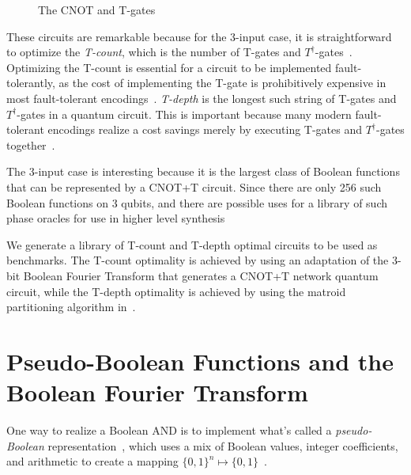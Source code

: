 \documentclass[a4paper]{article}
\makeatletter
\newcommand{\sublabel}[1]{\protected@edef\@currentlabel{\thefigure(\thesubfigure)}\label{#1}}
\makeatother
\begin{document}
\begin{figure}[t]
  \begin{minipage}{0.45\textwidth}
    \centering
    \scalebox{1.0}{
      
    }
    \sublabel{fig-cnot}
  \end{minipage}
  \begin{minipage}{0.45\textwidth}
  \centering
    \scalebox{1.0} {
      
    }
    \sublabel{fig-tgate}
    \scalebox{1.0} {
      
    }
    \sublabel{fig-tdgate}
  \end{minipage}
  \caption{The CNOT and T-gates}
  \label{fig-gates}
\end{figure}

These circuits are remarkable because for the 3-input case, it is straightforward to optimize
the {\it T-count}, which is the number of T-gates and $T^{\dagger}$-gates~\cite{amy-meet-in-middle}.
Optimizing the T-count is essential for a circuit to be implemented fault-tolerantly, as
the cost of implementing the T-gate is prohibitively expensive in most fault-tolerant
encodings~\cite{bib-herr-lattice,bib-fowler-bridge}. {\it T-depth} is the longest such
string of T-gates and $T^{\dagger}$-gates in a quantum circuit. This is important because many modern
fault-tolerant encodings realize a cost savings merely by executing T-gates and $T^{\dagger}$-gates
together~\cite{bib-google-ecc}.

The 3-input case is interesting because it is the largest class of Boolean functions that can be
represented by a CNOT+T circuit. Since there are only 256 such Boolean functions on 3 qubits, and
there are possible uses for a library of such phase oracles for use in higher level synthesis

We generate a library of T-count and T-depth optimal circuits to be used as benchmarks. The T-count
optimality is achieved by using an adaptation of the 3-bit Boolean Fourier Transform that generates
a CNOT+T network quantum circuit, while the T-depth optimality is achieved by using the matroid partitioning
algorithm in~\cite{bib-amy-matroid}.

\section{Pseudo-Boolean Functions and the Boolean Fourier Transform}

One way to realize a Boolean AND is to implement what's called a {\it pseudo-Boolean}
representation~\cite{bib-barenco-elementary,bib-amy-cnot}, which uses a mix of
Boolean values, integer coefficients, and arithmetic to create a mapping $\{0,1\}^n \mapsto \{0,1\}$~\cite{bib-amy-rm}.
\end{document}
